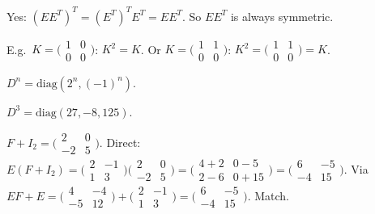 \begin{solutions}
    \item Yes: $(E E^{T})^{T} = (E^{T})^{T} E^{T} = E E^{T}$. So $E E^{T}$ is always symmetric.

    \item E.g.\ $K = \bigl(\begin{smallmatrix} 1 & 0 \\ 0 & 0 \end{smallmatrix}\bigr)$: $K^{2} = K$. Or $K = \bigl(\begin{smallmatrix} 1 & 1 \\ 0 & 0 \end{smallmatrix}\bigr)$: $K^{2} = \bigl(\begin{smallmatrix} 1 & 1 \\ 0 & 0 \end{smallmatrix}\bigr) = K$.

    \item $D^{n} = \mathrm{diag}(2^{n}, (-1)^{n})$.

    \item $D^{3} = \mathrm{diag}(27, -8, 125)$.

    \item $F + I_{2} = \bigl(\begin{smallmatrix} 2 & 0 \\ -2 & 5 \end{smallmatrix}\bigr)$. Direct: $E(F + I_{2}) = \bigl(\begin{smallmatrix} 2 & -1 \\ 1 & 3 \end{smallmatrix}\bigr)\bigl(\begin{smallmatrix} 2 & 0 \\ -2 & 5 \end{smallmatrix}\bigr) = \bigl(\begin{smallmatrix} 4 + 2 & 0 - 5 \\ 2 - 6 & 0 + 15 \end{smallmatrix}\bigr) = \bigl(\begin{smallmatrix} 6 & -5 \\ -4 & 15 \end{smallmatrix}\bigr)$. Via $E F + E = \bigl(\begin{smallmatrix} 4 & -4 \\ -5 & 12 \end{smallmatrix}\bigr) + \bigl(\begin{smallmatrix} 2 & -1 \\ 1 & 3 \end{smallmatrix}\bigr) = \bigl(\begin{smallmatrix} 6 & -5 \\ -4 & 15 \end{smallmatrix}\bigr)$. Match.


\end{solutions}
